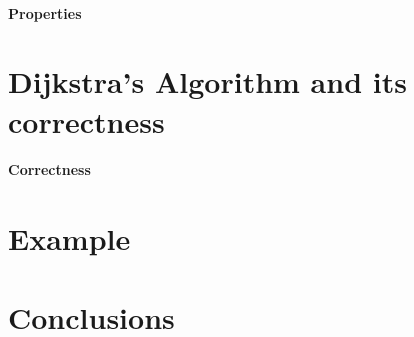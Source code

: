 \documentclass{llncs}
\begin{document}


\paragraph{Properties}
\label{subsect.properties}



\section{Dijkstra's Algorithm and its correctness}
\label{sect.dijkstras.algorithm.and.its.correctness}



\paragraph{Correctness}
\label{subsect.correctness}



\section{Example}
\label{sect.example}



\section{Conclusions}
\label{sect.conclusions}




\end{document}
